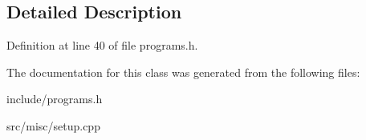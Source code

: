 \subsection{Detailed Description}


Definition at line 40 of file programs.\-h.



The documentation for this class was generated from the following files\-:\begin{DoxyCompactItemize}
\item 
include/programs.\-h\item 
src/misc/setup.\-cpp\end{DoxyCompactItemize}
